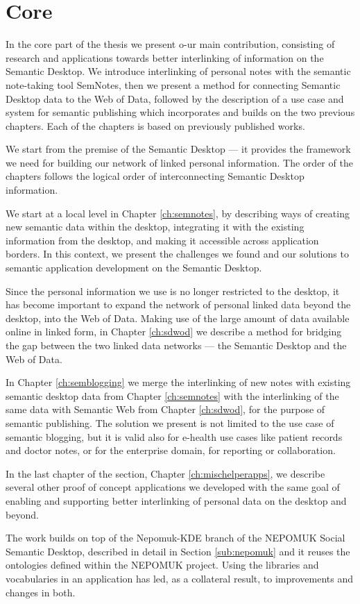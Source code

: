 \part{Core}
\label{part:core}

In the core part of the thesis we present o-ur main contribution, consisting of research and applications towards better interlinking of information on the Semantic Desktop. We introduce interlinking of personal notes with the semantic note-taking tool SemNotes, then we present a method for connecting Semantic Desktop data to the Web of Data, followed by the description of a use case and system for semantic publishing which incorporates and builds on the two previous chapters. Each of the chapters is based on previously published works.

We start from the premise of the Semantic Desktop --- it provides the framework we need for building our network of linked personal information. The order of the chapters follows the logical order of interconnecting Semantic Desktop information. 

We start at a local level in Chapter \ref{ch:semnotes}, by describing ways of creating new semantic data within the desktop, integrating it with the existing information from the desktop, and making it accessible across application borders. In this context, we present the challenges we found and our solutions to semantic application development on the Semantic Desktop.

Since the personal information we use is no longer restricted to the desktop, it has become important to expand the network of personal linked data beyond the desktop, into the Web of Data. Making use of the large amount of data available online in linked form, in Chapter \ref{ch:sdwod} we describe a method for bridging the gap between the two linked data networks --- the Semantic Desktop and the Web of Data. 

In Chapter \ref{ch:semblogging} we merge the interlinking of new notes with existing semantic desktop data from Chapter \ref{ch:semnotes} with the interlinking of the same data with Semantic Web from Chapter \ref{ch:sdwod}, for the purpose of semantic publishing. The solution we present is not limited to the use case of semantic blogging, but it is valid also for e-health use cases like patient records and doctor notes, or for the enterprise domain, for reporting or collaboration. 

In the last chapter of the section, Chapter \ref{ch:mischelperapps}, we describe several other proof of concept applications we developed with the same goal of enabling and supporting better interlinking of personal data on the desktop and beyond. 

The work builds on top of the Nepomuk-KDE branch of the NEPOMUK Social Semantic Desktop, described in detail in Section \ref{sub:nepomuk} and it reuses the ontologies defined within the NEPOMUK project. Using the libraries and vocabularies in an application has led, as a collateral result, to improvements and changes in both.








